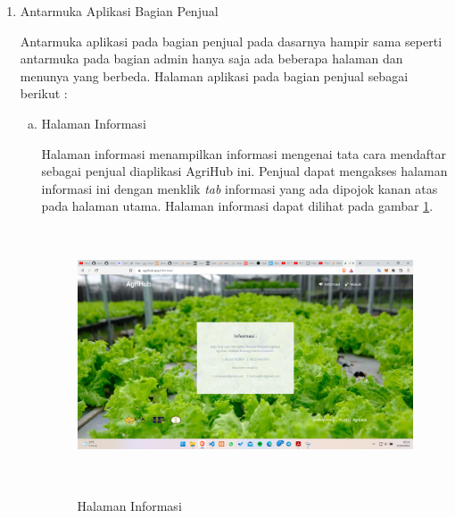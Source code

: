 \begin{enumerate}
	\newpage
	\item Antarmuka Aplikasi Bagian Penjual
	\par Antarmuka aplikasi pada bagian penjual pada dasarnya hampir sama seperti antarmuka pada bagian admin hanya saja ada beberapa halaman dan menunya yang berbeda. Halaman aplikasi pada bagian penjual sebagai berikut :

	\begin{enumerate}[a.]
		\item Halaman Informasi
		\par Halaman informasi menampilkan informasi mengenai tata cara mendaftar sebagai penjual diaplikasi AgriHub ini. Penjual dapat mengakses halaman informasi ini dengan menklik \textit{tab} informasi yang ada dipojok kanan atas pada halaman utama. Halaman informasi dapat dilihat pada gambar \ref*{informasi}.
		\begin{figure}[H]
			\centering
			{\includegraphics [width = 13cm, height= 7.5cm]{gambar/informasi}}
			\caption{Halaman Informasi}
			\label{informasi}
		\end{figure}


\end{enumerate}
\end{enumerate}
